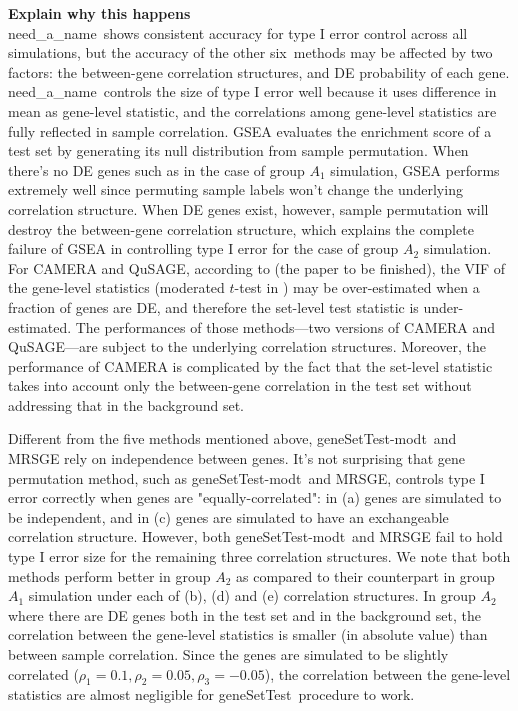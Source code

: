 \documentclass[useAMS,usenatbib, galley]{biom}
\newcommand{\OurMethod}{need\_a\_name}
\newcommand{\HowmanyTest}{six}
\newcommand{\aaCase}{a}
\newcommand{\aCase}{b}
\newcommand{\cCase}{c}
\newcommand{\eCase}{d}
\newcommand{\fCase}{e}
\newcommand{\gent}{geneSetTest-modt}
\newcommand{\gen}{geneSetTest}
\begin{document}
	\textbf{Explain why this happens}\\
	\OurMethod~shows consistent accuracy for type I error control across all simulations, but the accuracy of the other \HowmanyTest~methods may be affected by two factors: the between-gene correlation structures, and DE probability of each gene. \OurMethod~controls the size of type I error well because it uses difference in mean as gene-level statistic, and the correlations among gene-level statistics are fully reflected in sample correlation. GSEA evaluates the enrichment score of a test set by generating its null distribution from sample permutation. When there's no DE genes such as in the case of group $A_1$ simulation, GSEA performs extremely well since permuting sample labels won't change the underlying correlation structure. When DE genes exist, however, sample permutation will destroy the between-gene correlation structure, which explains the complete failure of GSEA in controlling type I error for the case of group $A_2$ simulation. For CAMERA and QuSAGE, according to (the paper to be finished), the VIF of the gene-level statistics (moderated $t$-test in \cite{wu2012camera}) may be over-estimated when a fraction of genes are DE, and therefore the set-level test statistic is under-estimated. The performances of those methods---two versions of CAMERA and QuSAGE---are subject to the underlying correlation structures. Moreover, the performance of CAMERA is complicated by the fact that the set-level statistic takes into account only the between-gene correlation in the test set without addressing that in the background set.
	
	Different from the five methods mentioned above, \gent~and MRSGE rely on independence between genes. It's not surprising that gene permutation method, such as \gent~and MRSGE, controls type I error correctly when genes are "equally-correlated": in (\aaCase) genes are simulated to be independent, and in (\cCase) genes are simulated to have an exchangeable correlation structure. However, both \gent~and MRSGE fail to hold type I error size for the remaining three correlation structures. We note that both methods perform better in group $A_2$ as compared to their counterpart in group $A_1$ simulation under each of (\aCase), (\eCase) and (\fCase) correlation structures. In group $A_2$ where there are DE genes both in the test set and in the background set, the correlation between the gene-level statistics is smaller (in absolute value) than between sample correlation. Since the genes are simulated to be slightly correlated ($\rho_1=0.1, \rho_2 = 0.05, \rho_3 = -0.05$), the correlation between the gene-level statistics are almost negligible for \gen~procedure to work. 
	
\end{document}
